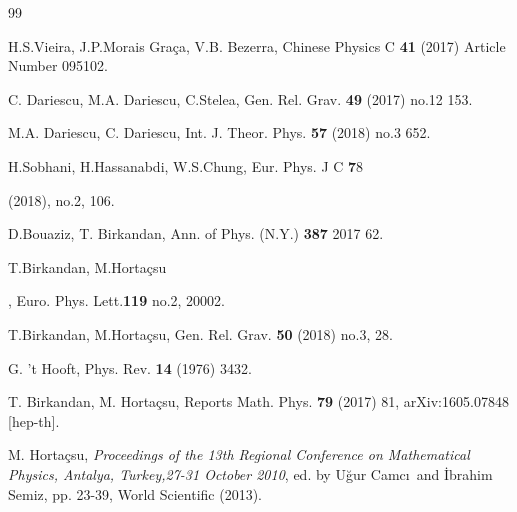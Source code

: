 \documentclass{article}
\begin{document}
\begin{thebibliography}{99}
{{ H.S.Vieira, J.P.Morais Gra\c{c}a, V.B. Bezerra,  Chinese Physics C \textbf{41} (2017) Article Number 095102.



 C. Dariescu, M.A. Dariescu, C.Stelea, Gen. Rel. Grav. \textbf{49} (2017) no.12 153.

 M.A. Dariescu, C. Dariescu, Int. J. Theor. Phys. \textbf{57} (2018) no.3 652.

 H.Sobhani, H.Hassanabdi, W.S.Chung, Eur. Phys. J C \textbf 78} (2018), no.2, 106.

 
  D.Bouaziz, T. Birkandan, Ann. of Phys. (N.Y.) \textbf{387} 2017 62.
 
  T.Birkandan, M.Horta\c{c}su}, Euro. Phys. Lett.\textbf{119} no.2, 20002. 
 
  T.Birkandan, M.Horta\c{c}su, Gen. Rel. Grav. \textbf{50} (2018) no.3, 28. 

  G. 't Hooft, Phys. Rev. \textbf{14} (1976) 3432.

 T. Birkandan, M. 
 Horta\c{c}su, Reports Math. Phys.  \textbf {79} (2017) 81, arXiv:1605.07848 [hep-th]. 
 
 
  M. Horta\c{c}su, \textit{Proceedings of the 13th Regional Conference on Mathematical Physics, Antalya, Turkey,27-31 October 2010}, ed. by U\u{g}ur Camc\i\ and \.{I}brahim Semiz, pp. 23-39, World Scientific (2013).

\end{thebibliography}
\end{document}
